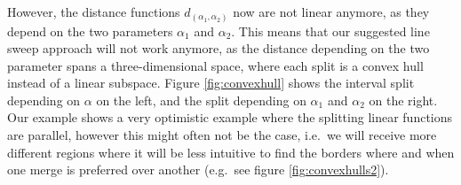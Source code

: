 However, the distance functions $d_{(\alpha_1, \alpha_2)}$ now are not linear anymore, as they depend on the two parameters $\alpha_1$ and $\alpha_2$. This means that our suggested line sweep approach will not work anymore, as the distance depending on the two parameter spans a three-dimensional space, where each split is a convex hull instead of a linear subspace. Figure \ref{fig:convexhull} shows the interval split depending on $\alpha$ on the left, and the split depending on $\alpha_1$ and $\alpha_2$ on the right. Our example shows a very optimistic example where the splitting linear functions are parallel, however this might often not be the case, i.e.\ we will receive more different regions where it will be less intuitive to find the borders where and when one merge is preferred over another (e.g.\ see figure \ref{fig:convexhulls2}).

